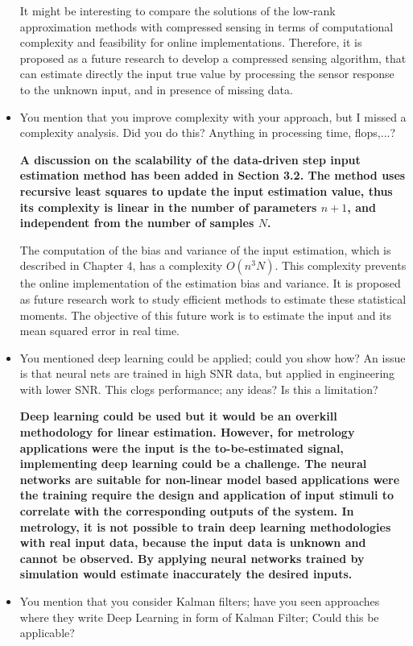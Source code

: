 \documentclass[11pt]{article}
\begin{document}
\begin{itemize}
    It might be interesting to compare the solutions of the low-rank approximation methods with compressed sensing in terms of computational complexity and feasibility for online implementations. 
    Therefore, it is proposed as a future research to develop a compressed sensing algorithm, that can estimate directly the input true value by processing the sensor response to the unknown input, and in presence of missing data. 
	\color{black}
	
	\item  You mention that you improve complexity with your approach, but I missed a complexity analysis. Did you do this? Anything in processing time, flops,...?
	
	{\bfseries A discussion on the scalability of the data-driven step input estimation method has been added in Section 3.2. The method uses recursive least squares to update the input estimation value, thus its complexity is linear in the number of parameters $n+1$, and independent from the number of samples $N$.
	
	The computation of the bias and variance of the input estimation, which is described in Chapter 4, has a complexity $O(n^3N)$. This complexity prevents the online implementation of the estimation bias and variance. It is proposed as future research work to study efficient methods to estimate these statistical moments. The objective of this future work is to estimate the input and its mean squared error in real time. }
	
	\item  You mentioned deep learning could be applied; could you show how? An issue is that neural nets are trained in high SNR data, but applied in engineering with lower SNR. This clogs performance; any ideas? Is this a limitation?
	
	{\bfseries Deep learning could be used but it would be an overkill methodology for linear estimation. However, for metrology applications were the input is the to-be-estimated signal, implementing deep learning could be a challenge. The neural networks are suitable for non-linear model based applications were the training require the design and application of input stimuli to correlate with the corresponding outputs of the system. 
	In metrology, it is not possible to train deep learning methodologies with real input data, because the input data is unknown and cannot be observed. 
	By applying neural networks trained by simulation would estimate inaccurately the desired inputs.  }
	
	\item  You mention that you consider Kalman filters; have you seen approaches where they write Deep Learning in form of Kalman Filter; Could this be applicable?
	

\end{itemize}
\end{document}
